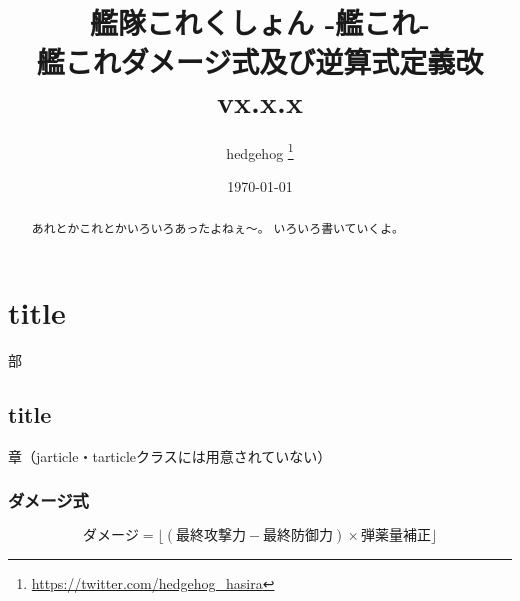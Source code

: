 \documentclass[10pt, a4paper]{jsreport}
\title{
    艦隊これくしょん -艦これ- \\ \vspace{3mm}
    \Huge 艦これダメージ式及び逆算式定義改vx.x.x
}
\author{
    \Large{hedgehog}
    \thanks{{\url{https://twitter.com/hedgehog_hasira}}}
}
\date{\today}
\begin{document}
\maketitle
\begin{abstract}
あれとかこれとかいろいろあったよねぇ～。
いろいろ書いていくよ。
\end{abstract}

\part{title} 部
\chapter{title}	章（jarticle・tarticleクラスには用意されていない）

\section{ダメージ式}

\[
    ダメージ = \big\lfloor (最終攻撃力 - 最終防御力) \times 弾薬量補正 \big\rfloor
\]
\end{document}
